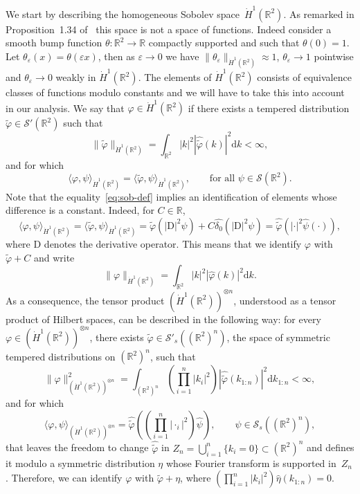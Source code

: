 \documentclass[10pt]{article}
\newcommand{\mathD}{\mathrm{D}}
\newcommand{\mathd}{\mathrm{d}}
\newcommand{\rightarrowlim}{\mathop{\rightarrow}\limits}
\begin{document}
We start by describing the homogeneous Sobolev space~$\dot{H}^1
(\mathbb{R}^2)$. As remarked in Proposition~1.34
of~{\cite{bahouri2011fourier}} this space is not a space of functions. Indeed
consider a smooth bump function $\theta : \mathbb{R}^2 \rightarrow \mathbb{R}$
compactly supported and such that $\theta (0) = 1$. Let $\theta_{\varepsilon}
(x) = \theta (\varepsilon x)$, then as $\varepsilon \rightarrow 0$ we have $\|
\theta_{\varepsilon} \|_{\dot{H}^1 (\mathbb{R}^2)} \approx 1$,
$\theta_{\varepsilon} \rightarrowlim 1$ pointwise and $\theta_{\varepsilon}
\rightarrow 0$ weakly in $\dot{H}^1 (\mathbb{R}^2)$. The elements of
$\dot{H}^1 (\mathbb{R}^2)$ consists of equivalence classes of functions modulo
constants and we will have to take this into account in our analysis. We say
that $\varphi \in \dot{H}^1 (\mathbb{R}^2)$ if there exists a tempered
distribution $\tilde{\varphi} \in \mathcal{S}' (\mathbb{R}^2)$ such that
\[ \| \tilde{\varphi} \|_{\dot{H}^1 (\mathbb{R}^2)} = \int_{\mathbb{R}^2} | k
   |^2  | \widehat{\tilde{\varphi}} (k) |^2 \mathd k < \infty, \]
and for which
\begin{equation}
  \langle \varphi, \psi \rangle_{\dot{H}^1 (\mathbb{R}^2)} = \langle
  \tilde{\varphi}, \psi \rangle_{\dot{H}^1 (\mathbb{R}^2)}, \qquad \text{for
  all } \psi \in \mathcal{S} (\mathbb{R}^2) . \label{eq:sob-def}
\end{equation}
Note that the equality~{\eqref{eq:sob-def}} implies an identification of
elements whose difference is a constant. Indeed, for $C \in \mathbb{R}$,
\[ \langle \varphi, \psi \rangle_{\dot{H}^1 (\mathbb{R}^2)} = \langle
   \tilde{\varphi}, \psi \rangle_{\dot{H}^1 (\mathbb{R}^2)} = \tilde{\varphi}
   (| \mathD |^2 \psi) + C \widehat{\delta_0} (| \mathD |^2 \psi) =
   \widehat{\tilde{\varphi}} (| \cdot |^2 \hat{\psi} (\cdot)), \]
where $\mathD$ denotes the derivative operator. This means that we identify
$\varphi$ with $\tilde{\varphi} + C$ and write
\[ \| \varphi \|_{\dot{H}^1 (\mathbb{R}^2)} = \int_{\mathbb{R}^2} | k |^2  |
   \hat{\varphi} (k) |^2 \mathd k. \]
As a consequence, the tensor product $(\dot{H}^1 (\mathbb{R}^2))^{\otimes n}$,
understood as a tensor product of Hilbert spaces, can be described in the
following way: for every $\varphi \in (\dot{H}^1 (\mathbb{R}^2))^{\otimes n}$,
there exists $\tilde{\varphi} \in \mathcal{S}'_s ((\mathbb{R}^2)^n)$, the
space of symmetric tempered distributions on $(\mathbb{R}^2)^n$, such that
\[ \| \varphi \|_{(\dot{H}^1 (\mathbb{R}^2))^{\otimes n}}^2 =
   \int_{(\mathbb{R}^2)^n} \left( \prod_{i = 1}^n | k_i |^2  \right) |
   \widehat{\tilde{\varphi}} (k_{1 : n}) |^2 \mathd k_{1 : n} < \infty, \]
and for which
\[ \langle \varphi, \psi \rangle_{(\dot{H}^1 (\mathbb{R}^2))^{\otimes n}} =
   \widehat{\tilde{\varphi}} \left( \left( \prod_{i = 1}^n | \cdot_i |^2 
   \right) \hat{\psi} \right), \qquad \psi \in \mathcal{S}_s
   ((\mathbb{R}^2)^n), \]
that leaves the freedom to change $\widehat{\tilde{\varphi}}$ in $Z_n =
\bigcup_{i = 1}^n \{ k_i = 0 \} \subset (\mathbb{R}^2)^n$ and defines it
modulo a symmetric distribution $\eta$ whose Fourier transform is supported
in~$Z_n$. Therefore, we can identify $\varphi$ with $\tilde{\varphi} + \eta$,
where $\left( \prod_{i = 1}^n | k_i |^2  \right) \hat{\eta} (k_{1 : n}) = 0$.
\end{document}
